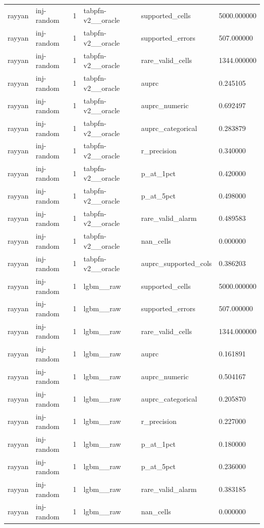 \begin{tabular}{llllll}
rayyan & inj-random & 1 & tabpfn-v2\_\_oracle & supported\_cells & 5000.000000 \\
rayyan & inj-random & 1 & tabpfn-v2\_\_oracle & supported\_errors & 507.000000 \\
rayyan & inj-random & 1 & tabpfn-v2\_\_oracle & rare\_valid\_cells & 1344.000000 \\
rayyan & inj-random & 1 & tabpfn-v2\_\_oracle & auprc & 0.245105 \\
rayyan & inj-random & 1 & tabpfn-v2\_\_oracle & auprc\_numeric & 0.692497 \\
rayyan & inj-random & 1 & tabpfn-v2\_\_oracle & auprc\_categorical & 0.283879 \\
rayyan & inj-random & 1 & tabpfn-v2\_\_oracle & r\_precision & 0.340000 \\
rayyan & inj-random & 1 & tabpfn-v2\_\_oracle & p\_at\_1pct & 0.420000 \\
rayyan & inj-random & 1 & tabpfn-v2\_\_oracle & p\_at\_5pct & 0.498000 \\
rayyan & inj-random & 1 & tabpfn-v2\_\_oracle & rare\_valid\_alarm & 0.489583 \\
rayyan & inj-random & 1 & tabpfn-v2\_\_oracle & nan\_cells & 0.000000 \\
rayyan & inj-random & 1 & tabpfn-v2\_\_oracle & auprc\_supported\_cols & 0.386203 \\
rayyan & inj-random & 1 & lgbm\_\_raw & supported\_cells & 5000.000000 \\
rayyan & inj-random & 1 & lgbm\_\_raw & supported\_errors & 507.000000 \\
rayyan & inj-random & 1 & lgbm\_\_raw & rare\_valid\_cells & 1344.000000 \\
rayyan & inj-random & 1 & lgbm\_\_raw & auprc & 0.161891 \\
rayyan & inj-random & 1 & lgbm\_\_raw & auprc\_numeric & 0.504167 \\
rayyan & inj-random & 1 & lgbm\_\_raw & auprc\_categorical & 0.205870 \\
rayyan & inj-random & 1 & lgbm\_\_raw & r\_precision & 0.227000 \\
rayyan & inj-random & 1 & lgbm\_\_raw & p\_at\_1pct & 0.180000 \\
rayyan & inj-random & 1 & lgbm\_\_raw & p\_at\_5pct & 0.236000 \\
rayyan & inj-random & 1 & lgbm\_\_raw & rare\_valid\_alarm & 0.383185 \\
rayyan & inj-random & 1 & lgbm\_\_raw & nan\_cells & 0.000000 \\

\end{tabular}

